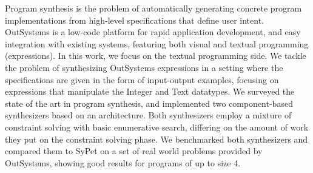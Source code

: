 Program synthesis is the problem of automatically generating concrete program
implementations from high-level specifications that define user intent.
OutSystems is a low-code platform for rapid application development,
and easy integration with existing systems, featuring both visual and
textual programming (expressions).
In this work, we focus on the textual programming side.
We tackle the problem of synthesizing OutSystems expressions in a setting where
the specifications are given in the form of input-output examples, focusing on
expressions that manipulate the Integer and Text datatypes.
We surveyed the state of the art in program synthesis, and implemented two
component-based  synthesizers based on an 
architecture.
Both synthesizers employ a mixture of constraint solving with basic enumerative
search, differing on the amount of work they put on the constraint solving
phase.
We benchmarked both synthesizers and compared them to SyPet on a set of real
world problems provided by OutSystems, showing good results for programs of up
to size 4.